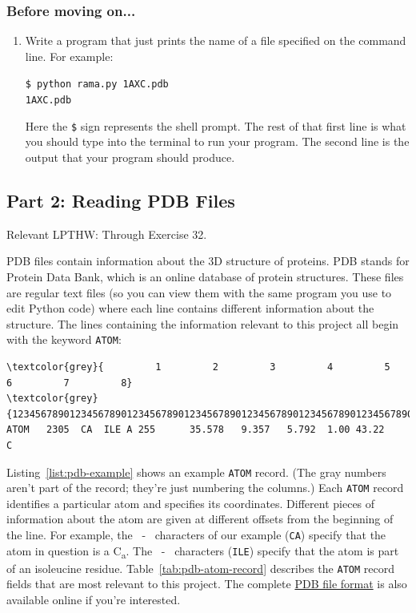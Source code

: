 \documentclass{article}
\newcommand{\calpha}{C\textsubscript{\textgreek{a}}}
\newcommand{\atomrec}{\texttt{ATOM} record}
\newenvironment{lpthw}
{Relevant LPTHW:}
{}
\newenvironment{problems}
{\subsubsection{Before moving on...} \begin{enumerate}}
{\end{enumerate}}
\begin{document}
\begin{problems}
 \item Write a program that just prints the name of a file specified on the 
  command line.  For example:

  \texttt{\$ python rama.py 1AXC.pdb \\ 1AXC.pdb}

  Here the \texttt{\$} sign represents the shell prompt.  The rest of that 
  first line is what you should type into the terminal to run your program.  
  The second line is the output that your program should produce.
\end{problems}

\subsection{Part 2: Reading PDB Files}

\begin{lpthw}
Through Exercise 32.
\end{lpthw}

PDB files contain information about the 3D structure of proteins.  PDB stands 
for Protein Data Bank, which is an online database of protein structures.  
These files are regular text files (so you can view them with the same program 
you use to edit Python code) where each line contains different information 
about the structure.  The lines containing the information relevant to this 
project all begin with the keyword \texttt{ATOM}:

\begin{listing}[h]
\centering
\begin{BVerbatim}[fontsize=\footnotesize,commandchars=\\\{\}]
\textcolor{grey}{         1         2         3         4         5         6         7         8}
\textcolor{grey}{12345678901234567890123456789012345678901234567890123456789012345678901234567890}
ATOM   2305  CA  ILE A 255      35.578   9.357   5.792  1.00 43.22           C  
\end{BVerbatim}
\caption{An example \atomrec{}.}
\label{list:pdb-example}
\end{listing}

Listing~\ref{list:pdb-example} shows an example \atomrec{}.  (The gray numbers 
aren't part of the record; they're just numbering the columns.)  Each 
\atomrec{} identifies a particular atom and specifies its coordinates.  
Different pieces of information about the atom are given at different offsets 
from the beginning of the line.  For example, the ~-~ 
characters of our example (\texttt{CA}) specify that the atom in question is a 
\calpha{}.  The ~-~ characters (\texttt{ILE}) specify that the 
atom is part of an isoleucine residue.
Table~\ref{tab:pdb-atom-record} describes the \atomrec{} fields that are most 
relevant to this project.  The complete 
\href{http://www.wwpdb.org/documentation/format33/v3.3.html}{PDB file format} 
is also available online if you're interested.
\end{document}
